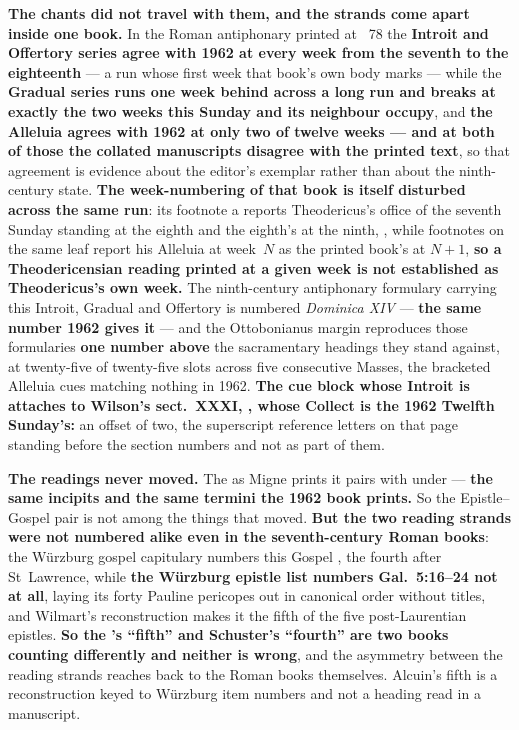 \textbf{The chants did not travel with them, and the strands come apart inside
one book.} In the Roman antiphonary printed at ~78 the
\textbf{Introit and Offertory series agree with 1962 at every week from the
seventh to the eighteenth} --- a run whose first week that book's own body marks
 --- while the
\textbf{Gradual series runs one week behind across a long run and breaks at
exactly the two weeks this Sunday and its neighbour occupy}, and \textbf{the
Alleluia agrees with 1962 at only two of twelve weeks --- and at both of those
the collated manuscripts disagree with the printed text}, so that agreement is
evidence about the editor's exemplar rather than about the ninth-century state.
\textbf{The week-numbering of that book is itself disturbed across the same
run}: its footnote a reports Theodericus's office of the seventh Sunday standing
at the eighth and the eighth's at the ninth, , while
footnotes on the same leaf report his Alleluia at week~$N$ as the printed book's
at $N{+}1$, \textbf{so a Theodericensian reading printed at a given week is not
established as Theodericus's own week.} The ninth-century antiphonary formulary
carrying this Introit, Gradual and Offertory is numbered
\emph{Dominica XIV} --- \textbf{the same number 1962 gives it} --- and the
Ottobonianus margin reproduces those formularies \textbf{one number above} the
sacramentary headings they stand against, at twenty-five of twenty-five slots
across five consecutive Masses, the bracketed Alleluia cues matching nothing in
1962. \textbf{The cue block whose Introit is  attaches
to Wilson's sect.~XXXI, , whose Collect
is the 1962 Twelfth Sunday's:} an offset of two, the superscript reference
letters on that page standing before the section numbers and not as part of
them.

\textbf{The readings never moved.} The  as Migne prints it
pairs  with  under  --- \textbf{the same incipits and the same termini the
1962 book prints.} So the Epistle--Gospel pair is not among the things that
moved. \textbf{But the two reading strands were not numbered alike even in the
seventh-century Roman books}: the Würzburg gospel capitulary numbers this Gospel
, the fourth after St~Lawrence, while
\textbf{the Würzburg epistle list numbers Gal.\ 5:16--24 not at all}, laying
its forty Pauline pericopes out in canonical order without titles, and Wilmart's
reconstruction makes it the fifth of the five post-Laurentian epistles.
\textbf{So the 's ``fifth'' and Schuster's ``fourth'' are
two books counting differently and neither is wrong}, and the asymmetry between
the reading strands reaches back to the Roman books themselves. Alcuin's fifth
is a reconstruction keyed to Würzburg item numbers and not a heading read in a
manuscript.

